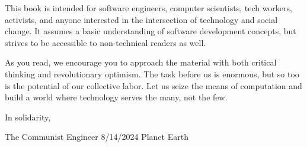 \documentclass{book}
\begin{document}
\begin{multicols}{2}
{This book is intended for software engineers, computer scientists, tech workers, activists, and anyone interested in the intersection of technology and social change. It assumes a basic understanding of software development concepts, but strives to be accessible to non-technical readers as well.

As you read, we encourage you to approach the material with both critical thinking and revolutionary optimism. The task before us is enormous, but so too is the potential of our collective labor. Let us seize the means of computation and build a world where technology serves the many, not the few.
}
\end{multicols}
In solidarity,

The Communist Engineer
8/14/2024
Planet Earth


\setcounter{tocdepth}{4}
\setcounter{secnumdepth}{4}
\tableofcontents

\mainmatter













\backmatter

\end{document}
